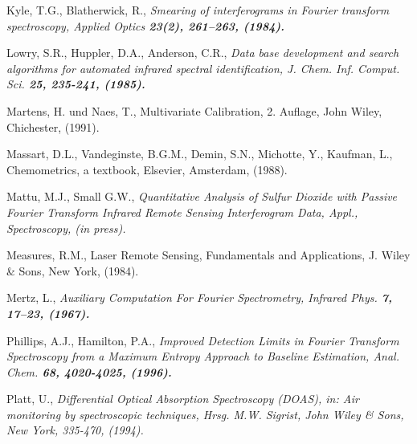 \begin{thebibliography}{giese-bogdan,199797}
 Kyle, T.G., Blatherwick, R., \it
Smearing of interferograms in Fourier transform spectroscopy\rm ,
Applied Optics \bf 23\rm (2), 261--263, (1984).

 Lowry, S.R., Huppler, D.A., Anderson, C.R.,
\it Data base development and search algorithms for automated
infrared spectral identification\rm , J. Chem. Inf. Comput. Sci.
\bf 25\rm , 235-241, (1985).



 Martens, H. und Naes, T., Multivariate Calibration,
2. Auflage, John Wiley, Chichester, (1991).

 Massart, D.L., Vandeginste,
B.G.M., Demin, S.N., Michotte, Y., Kaufman, L., Chemometrics, a
textbook, Elsevier, Amsterdam, (1988).

 Mattu, M.J., Small G.W., \it
Quantitative Analysis of Sulfur Dioxide with Passive Fourier
Transform Infrared Remote Sensing Interferogram Data\rm , Appl.,
Spectroscopy, (in press).

 Measures, R.M., Laser Remote
Sensing, Fundamentals and Applications, J. Wiley \& Sons, New
York, (1984).

 Mertz, L., \it Auxiliary Computation For Fourier
Spectrometry\rm , Infrared Phys. \bf 7\rm , 17--23, (1967).

 Phillips, A.J., Hamilton, P.A., \it Improved Detection
Limits in Fourier Transform Spectroscopy from a Maximum Entropy
Approach to Baseline Estimation\rm , Anal. Chem. \bf 68\rm ,
4020-4025, (1996).

 Platt, U., \it Differential Optical Absorption
Spectroscopy (DOAS)\rm , in: Air monitoring by spectroscopic
techniques, Hrsg. M.W. Sigrist, John Wiley \& Sons, New York,
335-470, (1994).


\end{thebibliography}
